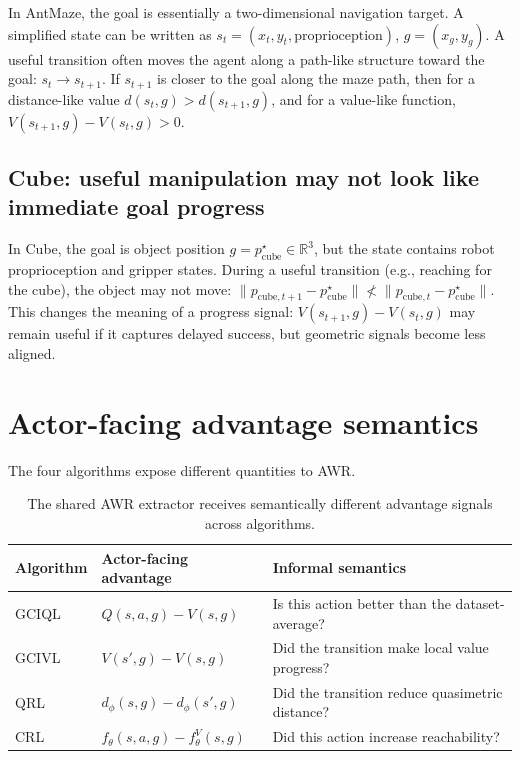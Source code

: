 \documentclass[11pt]{article}
\begin{document}
In AntMaze, the goal is essentially a two-dimensional navigation target. A simplified state can be written as
$s_t = (x_t,y_t,\text{proprioception})$, $g=(x_g,y_g)$.
A useful transition often moves the agent along a path-like structure toward the goal: $s_t \rightarrow s_{t+1}$.
If $s_{t+1}$ is closer to the goal along the maze path, then for a distance-like value $d(s_t,g) > d(s_{t+1},g)$,
and for a value-like function, $V(s_{t+1},g) - V(s_t,g) > 0$.

\subsection{Cube: useful manipulation may not look like immediate goal progress}

In Cube, the goal is object position $g = p_{\mathrm{cube}}^{\star} \in \mathbb{R}^3$, but the state contains robot proprioception and gripper states.
During a useful transition (e.g., reaching for the cube), the object may not move: $\|p_{\mathrm{cube},t+1}-p_{\mathrm{cube}}^\star\| \not< \|p_{\mathrm{cube},t}-p_{\mathrm{cube}}^\star\|$.
This changes the meaning of a progress signal: $V(s_{t+1},g)-V(s_t,g)$ may remain useful if it captures delayed success, but geometric signals become less aligned.

\section{Actor-facing advantage semantics}

The four algorithms expose different quantities to AWR.

\begin{table}[htb]
\centering
\small
\renewcommand{\arraystretch}{1.2}
\begin{tabular}{lll}
\toprule
Algorithm & Actor-facing advantage & Informal semantics \\
\midrule
GCIQL & $Q(s,a,g)-V(s,g)$ & Is this action better than the dataset-average? \\
GCIVL & $V(s',g)-V(s,g)$ & Did the transition make local value progress? \\
QRL   & $d_\phi(s,g)-d_\phi(s',g)$ & Did the transition reduce quasimetric distance? \\
CRL   & $f_\theta(s,a,g)-f^V_\theta(s,g)$ & Did this action increase reachability? \\
\bottomrule
\end{tabular}
\caption{The shared AWR extractor receives semantically different advantage signals across algorithms.}
\end{table}
\end{document}
